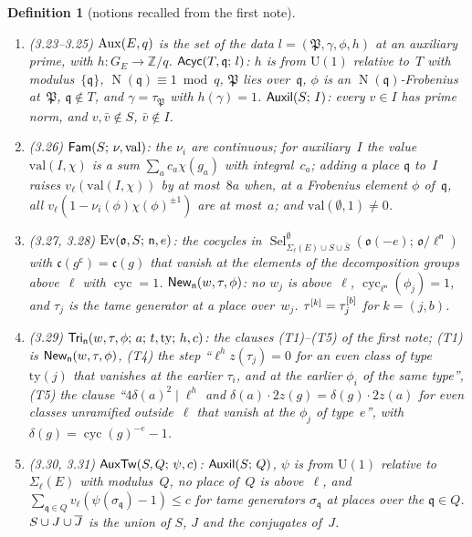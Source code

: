 \documentclass[11pt,a4paper]{article}
\newcommand{\m}[1]{\mbox{$#1$}}        %
\theoremstyle{plainx}
\theoremstyle{uprightx}
\newtheorem{definition}[theorem]{Definition}
\newcommand{\GE}[1]{G_{#1}}
\newcommand{\cyc}{\operatorname{cyc}}
\newcommand{\vl}{v_\ell}
\newcommand{\Sel}[4]{\operatorname{Sel}_{#2}^{#3}(#1;\,#4)}
\newcommand{\pd}[2]{\Sigma_{#2}(#1)}
\newcommand{\cj}[1]{\bar{#1}}
\newcommand{\Nm}{\operatorname{N}}
\newcommand{\fo}{\mathfrak{o}}
\newcommand{\fP}{\mathfrak{P}}
\newcommand{\fq}{\mathfrak{q}}
\begin{document}
\begin{definition}[notions recalled from the first note]
\begin{enumerate}[label=\textup{(\arabic*)},leftmargin=2.3em,itemsep=2pt]
\item (3.23--3.25) \m{\AuxPrimeData{E}{q}} is the set of the data \m{l=(\fP,\gamma,\phi,h)} at an auxiliary prime, with
\m{h\colon\GE{E}\to\mathbb{Z}/q}. \m{\IsAnticyclotomicAt{T}{\fq}{l}}: $h$ is from $\mathrm{U}(1)$ relative to~$T$ with
modulus~\m{\{\fq\}}, \m{\Nm(\fq)\equiv1\bmod q}, $\fP$ lies over~$\fq$, $\phi$ is an \m{\Nm(\fq)}-Frobenius at~$\fP$,
\m{\fq\notin T}, and \m{\gamma=\tau_{\fP}} with \m{h(\gamma)=1}. \m{\IsAuxiliary{S}{I}}: every \m{v\in I} has prime norm,
and \m{v,\cj{v}\notin S}, \m{\cj{v}\notin I}.
\item (3.26) \m{\IsFamily{S}{\nu}{\mathrm{val}}}: the $\nu_i$ are continuous; for auxiliary~$I$ the value
\m{\mathrm{val}(I,\chi)} is a sum \m{\sum_ac_a\chi(g_a)} with integral~$c_a$; adding a place $\fq$ to~$I$ raises
\m{\vl(\mathrm{val}(I,\chi))} by at most~$8a$ when, at a Frobenius element $\phi$ of~$\fq$, all
\m{\vl(1-\nu_i(\phi)\chi(\phi)^{\pm1})} are at most~$a$; and \m{\mathrm{val}(\emptyset,1)\ne0}.
\item (3.27, 3.28) \m{\evenClasses{\fo}{S}{\mathsf{n}}{e}}: the cocycles in
\m{\Sel{\fo(-e)}{\pd{E}{\ell}\cup S\cup\cj{S}}{\emptyset}{\fo/\ell^\mathsf{n}}} with \m{\mathfrak{c}(g^{\mathsf c})=\mathfrak{c}(g)} that vanish at the
elements of the decomposition groups above~$\ell$ with \m{\cyc=1}. \m{\IsNewPlaces{\mathsf{n}}{w}{\tau}{\phi}}: no $w_j$ is
above~$\ell$, \m{\cyc_{\ell^\mathsf{n}}(\phi_j)=1}, and $\tau_j$ is the tame generator at a place over~$w_j$.
\m{\withConjInv{\tau}{k}=\tau_j^{[b]}} for \m{k=(j,b)}.
\item (3.29) \m{\IsPrimeTriangle{\mathsf{n}}{w}{\tau}{\phi}{a}{t}{\mathrm{ty}}{h}{c}}: the clauses (T1)--(T5) of the first
note; (T1) is \m{\IsNewPlaces{\mathsf{n}}{w}{\tau}{\phi}}, (T4) the step ``\m{\ell^{h}z(\tau_j)=0} for an even class
of type \m{\mathrm{ty}(j)} that vanishes at the earlier $\tau_i$, and at the earlier $\phi_i$ of the same type'',
(T5) the clause ``\m{4\delta(a)^2\mid\ell^{h}} and \m{\delta(a)\cdot2z(g)=\delta(g)\cdot2z(a)} for even classes
unramified outside~$\ell$ that vanish at the $\phi_j$ of type~$e$'', with \m{\delta(g)=\cyc(g)^{-e}-1}.
\item (3.30, 3.31) \m{\IsAuxTwist{S}{Q}{\psi}{c}}: \m{\IsAuxiliary{S}{Q}}, $\psi$ is from $\mathrm{U}(1)$ relative to
\m{\pd{E}{\ell}} with modulus~$Q$, no place of~$Q$ is above~$\ell$, and \m{\sum_{\fq\in Q}\vl(\psi(\sigma_{\fq})-1)\le c}
for tame generators \m{\sigma_{\fq}} at places over the \m{\fq\in Q}. \m{\unionWithConj{S}{J}} is the union of $S$,
$J$ and the conjugates of~$J$.

\end{enumerate}
\end{definition}
\end{document}
